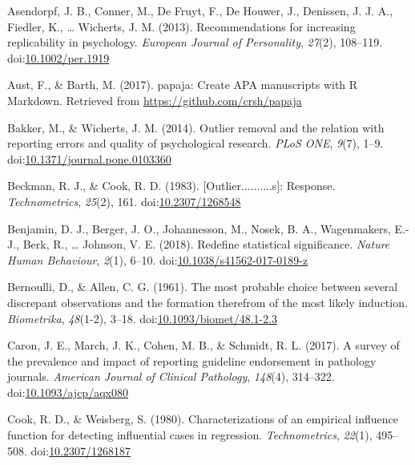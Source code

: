 \documentclass[english,,man]{apa6}
\begin{document}
\hypertarget{refs}{}
\leavevmode\hypertarget{ref-Asendorpf2012}{}%
Asendorpf, J. B., Conner, M., De Fruyt, F., De Houwer, J., Denissen, J. J. A., Fiedler, K., \ldots{} Wicherts, J. M. (2013). Recommendations for increasing replicability in psychology. \emph{European Journal of Personality}, \emph{27}(2), 108--119. doi:\href{https://doi.org/10.1002/per.1919}{10.1002/per.1919}

\leavevmode\hypertarget{ref-Aust2017}{}%
Aust, F., \& Barth, M. (2017). papaja: Create APA manuscripts with R Markdown. Retrieved from \url{https://github.com/crsh/papaja}

\leavevmode\hypertarget{ref-Bakker2014}{}%
Bakker, M., \& Wicherts, J. M. (2014). Outlier removal and the relation with reporting errors and quality of psychological research. \emph{PLoS ONE}, \emph{9}(7), 1--9. doi:\href{https://doi.org/10.1371/journal.pone.0103360}{10.1371/journal.pone.0103360}

\leavevmode\hypertarget{ref-Beckman1983}{}%
Beckman, R. J., \& Cook, R. D. (1983). {[}Outlier..........s{]}: Response. \emph{Technometrics}, \emph{25}(2), 161. doi:\href{https://doi.org/10.2307/1268548}{10.2307/1268548}

\leavevmode\hypertarget{ref-Benjamin2018}{}%
Benjamin, D. J., Berger, J. O., Johannesson, M., Nosek, B. A., Wagenmakers, E.-J., Berk, R., \ldots{} Johnson, V. E. (2018). Redefine statistical significance. \emph{Nature Human Behaviour}, \emph{2}(1), 6--10. doi:\href{https://doi.org/10.1038/s41562-017-0189-z}{10.1038/s41562-017-0189-z}

\leavevmode\hypertarget{ref-Bernoulli1777}{}%
Bernoulli, D., \& Allen, C. G. (1961). The most probable choice between several discrepant observations and the formation therefrom of the most likely induction. \emph{Biometrika}, \emph{48}(1-2), 3--18. doi:\href{https://doi.org/10.1093/biomet/48.1-2.3}{10.1093/biomet/48.1-2.3}

\leavevmode\hypertarget{ref-Caron2017}{}%
Caron, J. E., March, J. K., Cohen, M. B., \& Schmidt, R. L. (2017). A survey of the prevalence and impact of reporting guideline endorsement in pathology journals. \emph{American Journal of Clinical Pathology}, \emph{148}(4), 314--322. doi:\href{https://doi.org/10.1093/ajcp/aqx080}{10.1093/ajcp/aqx080}

\leavevmode\hypertarget{ref-Cook1980}{}%
Cook, R. D., \& Weisberg, S. (1980). Characterizations of an empirical influence function for detecting influential cases in regression. \emph{Technometrics}, \emph{22}(1), 495--508. doi:\href{https://doi.org/10.2307/1268187}{10.2307/1268187}
\end{document}
